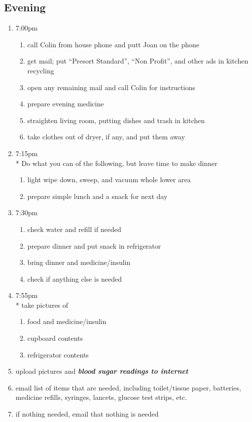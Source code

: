 \documentclass[12pt,letterpaper]{article}
\begin{document}
\begin{multicols}{2}
\subsection*{Evening}
\begin{enumerate}
	\item 7:00pm
		\begin{enumerate}
			\item call Colin from house phone and putt Joan on the phone
			\item get mail; put ``Presort Standard'', ``Non Profit'', and other ads in kitchen recycling
			\item open any remaining mail and call Colin for instructions
			\item prepare evening medicine
			\item straighten living room, putting dishes and trash in kitchen
			\item take clothes out of dryer, if any, and put them away
		\end{enumerate}
	\item 7:15pm \\*
		Do what you can of the following, but leave time to make dinner
		\begin{enumerate}
			\item light wipe down, sweep, and vacuum whole lower area
			\item prepare simple lunch and a snack for next day
		\end{enumerate}
	\item 7:30pm
		\begin{enumerate}
			\item check water and refill if needed
			\item prepare dinner and put snack in refrigerator
			\item bring dinner and medicine/insulin
			\item check if anything else is needed
		\end{enumerate}
	\item 7:55pm \\*
		take pictures of 
		\begin{enumerate}
			\item food and medicine/insulin
			\item	cupboard contents
			\item	refrigerator contents
		\end{enumerate}
	\item upload pictures and \textit{\textbf{blood sugar readings to internet}}
	\item email list of items that are needed, including toilet/tissue paper, batteries, medicine refills, syringes, lancets, glucose test strips, etc.
	\item if nothing needed, email that nothing is needed
\end{enumerate}
\end{multicols}
\end{document}
